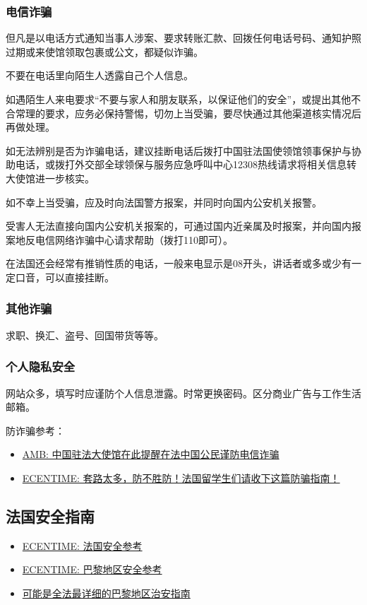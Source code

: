 \documentclass[UTF8]{ctexart}
\begin{document}
\subsubsection{电信诈骗}
但凡是以电话方式通知当事人涉案、要求转账汇款、回拨任何电话号码、通知护照过期或来使馆领取包裹或公文，都疑似诈骗。

不要在电话里向陌生人透露自己个人信息。

如遇陌生人来电要求“不要与家人和朋友联系，以保证他们的安全”，或提出其他不合常理的要求，应务必保持警惕，切勿上当受骗，要尽快通过其他渠道核实情况后再做处理。

如无法辨别是否为诈骗电话，建议挂断电话后拨打中国驻法国使领馆领事保护与协助电话，或拨打外交部全球领保与服务应急呼叫中心12308热线请求将相关信息转大使馆进一步核实。

如不幸上当受骗，应及时向法国警方报案，并同时向国内公安机关报警。

受害人无法直接向国内公安机关报案的，可通过国内近亲属及时报案，并向国内报案地反电信网络诈骗中心请求帮助（拨打110即可）。

在法国还会经常有推销性质的电话，一般来电显示是08开头，讲话者或多或少有一定口音，可以直接挂断。

\subsubsection{其他诈骗}
求职、换汇、盗号、回国带货等等。

\subsubsection{个人隐私安全}
网站众多，填写时应谨防个人信息泄露。时常更换密码。区分商业广告与工作生活邮箱。

防诈骗参考：
\begin{itemize}
    \item \href{http://www.amb-chine.fr/chn/sgxw/t1823322.htm}{AMB: 中国驻法大使馆在此提醒在法中国公民谨防电信诈骗}
    \item \href{https://www.ecentime.com/article/bien-vivre-en-france}{ECENTIME: 套路太多，防不胜防！法国留学生们请收下这篇防骗指南！}
\end{itemize}

\subsection{法国安全指南}
\begin{itemize}
    \item \href{https://www.ecentime.com/article/security-guide-in-france}{ECENTIME: 法国安全参考}
    \item 
    \href{https://www.ecentime.com/article/securite-arrondissement}{ECENTIME: 巴黎地区安全参考}
    \item \href{https://mp.weixin.qq.com/s/EOGbefPAPmCXaiPJtq32Gw}{可能是全法最详细的巴黎地区治安指南}
\end{itemize}
\end{document}
